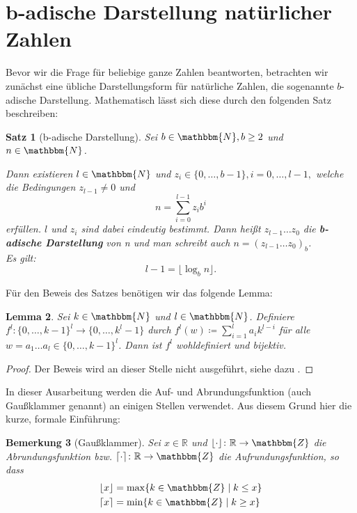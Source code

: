 \documentclass{article}
\newcommand{\N}{\mathbbm{N}} %
\newcommand{\Z}{\mathbbm{Z}} %
\newcommand{\R}{\mathbb{R}} %
\newcommand{\nbdash}{\mbox{-}} %
\newtheorem{satz}{Satz}
\newtheorem{lemma}[satz]{Lemma}
\newtheorem{bemerkung}[satz]{Bemerkung}
\begin{document}
\newpage

\section{b-adische Darstellung natürlicher Zahlen}
  Bevor wir die Frage für beliebige ganze Zahlen beantworten, betrachten wir zunächst eine übliche Darstellungsform für natürliche Zahlen, die sogenannte $b$-adische Darstellung.
  Mathematisch lässt sich diese durch den folgenden Satz beschreiben: 

  \begin{satz}[b-adische Darstellung] \label{satz:b-adische_Darstellung}
    Sei $b\in \N, b \geq 2$ und $n \in \N$. 

    Dann existieren $l \in \N$ und $z_i \in \{0, \dots, b-1\}, {i = 0, \dots, l-1},$ welche die Bedingungen $z_{l-1} \neq 0$ und 
    \begin{equation}
      n = \sum_{i=0}^{l-1}z_ib^i \label{eq:b-adische_Darstellung_n}
    \end{equation}
    erfüllen.
    $l$ und $z_i$ sind dabei eindeutig bestimmt. Dann heißt $z_{l-1}\dots z_0$ die \textbf{b\nbdash adische Darstellung} von n und man schreibt auch $n=(z_{l-1} \dots z_0)_b$. \\
    Es gilt: 
    \begin{equation}
      l-1 = \lfloor \log_b n \rfloor. \label{eq:b-adische_Darstellung_log}
    \end{equation}
  \end{satz}

  Für den Beweis des Satzes benötigen wir das folgende Lemma:

    \begin{lemma} \label{lemma:Eindeutigkeit_b-adische_Darstellung}
      Sei $k \in \N$ und $l \in \N$. 
      Definiere $f^l \colon \{0, \dots, k-1\}^l \to \{0, \dots, k^l-1\}$ durch $f^l(w) \coloneq \sum_{i=1}^l a_i k^{l-i}$ für alle $w=a_1 \dots a_l \in \{0, \dots, k-1\}^l$.
      Dann ist $f^l$ wohldefiniert und bijektiv.
    \end{lemma}
      \begin{proof}
        Der Beweis wird an dieser Stelle nicht ausgeführt, siehe dazu \cite[S.~17f,~Lemma~1.19]{hougardy2018}.
      \end{proof}

    In dieser Ausarbeitung werden die Auf- und Abrundungsfunktion (auch Gaußklammer genannt) an einigen Stellen verwendet.
    Aus diesem Grund hier die kurze, formale Einführung:
    \begin{bemerkung}[Gaußklammer]\label{bem:Gaussklammer}
      Sei $x \in \R$ und $\lfloor \cdot \rfloor \colon \R \to \Z$ die Abrundungsfunktion bzw. $\lceil \cdot \rceil \colon \R \to \Z$ die Aufrundungsfunktion, so dass
      \begin{align*}
        \lfloor x \rfloor &= \max\{k \in \Z \mid k \leq x\} \\
        \lceil x \rceil &= \min\{k \in \Z \mid k \geq x\}
      \end{align*}
    \end{bemerkung}
    
\end{document}
